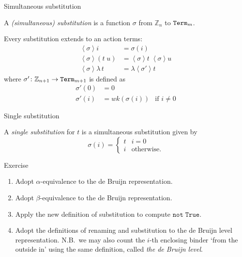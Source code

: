 \begin{frame}{Simultaneous substitution}
  \begin{definition}
    A \emph{(simultaneous) substitution} is a function $\sigma$ from $\mathbb{Z}_n$ to $\mathtt{Term}_m$.
  \end{definition}
  Every substitution extends to an action terms: 
  \begin{align*}
    \left< \sigma \right> i                 & = \sigma(i)                                \\
    \left< \sigma \right> \left(t\;u\right) & = \left<\sigma\right>t \; \left<\sigma\right>u \\
    \left< \sigma \right> \lambda\,t        & = \lambda\left< \sigma' \right> t
  \end{align*}
  where $\sigma' \colon \mathbb{Z}_{n+1} \to \mathtt{Term}_{m+1}$ is defined as
  \begin{align*}
    \sigma'(0) & = 0 \\
    \sigma'(i) & = \mathit{wk}\left(\sigma(i)\right) & \text{if $i \neq 0$}
  \end{align*}
\end{frame}

\begin{frame}{Single substitution}
  \begin{definition}
    A \emph{single substitution} for $t$ is a simultaneous substitution given by
    \[
      \sigma(i) =
      \begin{cases}
        t & \text{$i = 0$} \\
        i & \text{otherwise.}
      \end{cases}
    \]
  \end{definition}
\end{frame}

\begin{frame}{Exercise}
  \begin{enumerate}
    \item Adopt $\alpha$-equivalence to the de Bruijn representation.
    \item Adopt $\beta$-equivalence to the de Bruijn representation.
    \item Apply the new definition of substitution to compute $\mathtt{not}\;\mathtt{True}$.
    \item Adopt the definitions of renaming and substitution to the de Bruijn level representation.
  N.B.\ we may also count the $i$-th enclosing binder `from the outside in' using the same definition, called \emph{the de Bruijn level}.
  \end{enumerate}
\end{frame}

